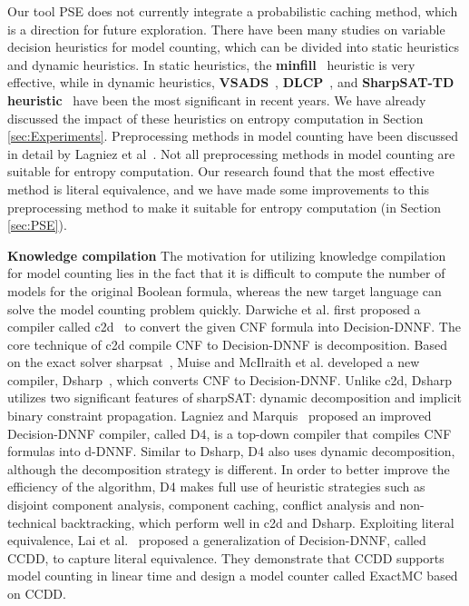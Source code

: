 Our tool PSE does not currently integrate a probabilistic caching method, which is a direction for future exploration. 
There have been many studies on variable decision heuristics for model counting, which can be divided into static heuristics and dynamic heuristics. 
In static heuristics, the \textbf{minfill}~\cite{darwiche2009modeling} heuristic is very effective, while in dynamic heuristics, \textbf{VSADS}~\cite{sang2005heuristics}, \textbf{DLCP}~\cite{lai2021power}, and \textbf{SharpSAT-TD  heuristic}~\cite{korhonen2021integrating} have been the most significant in recent years. 
We have already discussed the impact of these heuristics on entropy computation in Section \ref{sec:Experiments}.
Preprocessing methods in model counting have been discussed in detail by Lagniez et al~\cite{lagniez2017preprocessing}. 
Not all preprocessing methods in model counting are suitable for entropy computation. 
Our research found that the most effective method is literal equivalence, and we have made some improvements to this preprocessing method to make it suitable for entropy computation (in Section \ref{sec:PSE}).

\textbf{Knowledge compilation} %
The motivation for utilizing knowledge compilation for model counting lies in the fact that it is difficult to compute the number of models for the original Boolean formula, whereas the new target language can solve the model counting problem quickly. 
Darwiche et al. first proposed a compiler called c2d~\cite{darwiche2004new} to convert the given CNF formula into Decision-DNNF. 
The core technique of c2d compile CNF to Decision-DNNF is decomposition.
Based on the exact solver sharpsat~\cite{thurley2006sharpsat}, Muise and McIlraith et al. developed a new compiler, Dsharp~\cite{muise2012d}, which converts CNF to Decision-DNNF. 
Unlike c2d, Dsharp utilizes two significant features of sharpSAT: dynamic decomposition and implicit binary constraint propagation. 
Lagniez and Marquis~\cite{lagniez2017improved} proposed an improved Decision-DNNF compiler, called D4, is a top-down compiler that compiles CNF formulas into d-DNNF.
Similar to Dsharp, D4 also uses dynamic decomposition, although the decomposition strategy is different.
In order to better improve the efficiency of the algorithm, D4 makes full use of heuristic strategies such as disjoint component analysis, component caching, conflict analysis and non-technical backtracking, which perform well in c2d and Dsharp. 
Exploiting literal equivalence, Lai et al.~\cite{lai2021power} proposed a generalization of Decision-DNNF, called CCDD, to capture literal equivalence. 
They demonstrate that CCDD supports model counting in linear time and design a model counter called ExactMC based on CCDD.

